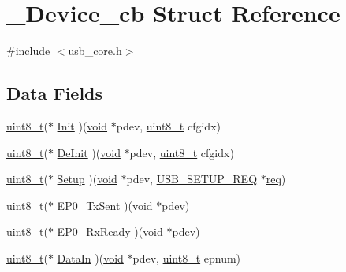 \hypertarget{struct___device__cb}{\section{\-\_\-\-Device\-\_\-cb Struct Reference}
\label{struct___device__cb}
}


{\ttfamily \#include $<$usb\-\_\-core.\-h$>$}

\subsection*{Data Fields}
\begin{DoxyCompactItemize}
\item 
\hyperlink{stdint_8h_aba7bc1797add20fe3efdf37ced1182c5}{uint8\-\_\-t}($\ast$ \hyperlink{struct___device__cb_a32d5bd2c14d36adaeee879efb2d99937}{Init} )(\hyperlink{group___n_a_m_e_ga18028b8badbf1ea7e704ccac3c488e82}{void} $\ast$pdev, \hyperlink{stdint_8h_aba7bc1797add20fe3efdf37ced1182c5}{uint8\-\_\-t} cfgidx)
\item 
\hyperlink{stdint_8h_aba7bc1797add20fe3efdf37ced1182c5}{uint8\-\_\-t}($\ast$ \hyperlink{struct___device__cb_a356783fc0dd7be07db7d764214937dad}{De\-Init} )(\hyperlink{group___n_a_m_e_ga18028b8badbf1ea7e704ccac3c488e82}{void} $\ast$pdev, \hyperlink{stdint_8h_aba7bc1797add20fe3efdf37ced1182c5}{uint8\-\_\-t} cfgidx)
\item 
\hyperlink{stdint_8h_aba7bc1797add20fe3efdf37ced1182c5}{uint8\-\_\-t}($\ast$ \hyperlink{struct___device__cb_ab7ffbb974bc00c175cfed7ba03c8b16b}{Setup} )(\hyperlink{group___n_a_m_e_ga18028b8badbf1ea7e704ccac3c488e82}{void} $\ast$pdev, \hyperlink{group___u_s_b___c_o_r_e___exported___types_gacd8d898c844c3657315c7d7a4ea3a99c}{U\-S\-B\-\_\-\-S\-E\-T\-U\-P\-\_\-\-R\-E\-Q} $\ast$\hyperlink{pios__opahrs__proto_8h_ad651fd9affe5ed0ac9abccd8e2791a2c}{req})
\item 
\hyperlink{stdint_8h_aba7bc1797add20fe3efdf37ced1182c5}{uint8\-\_\-t}($\ast$ \hyperlink{struct___device__cb_af5e2e1683935d2e6655930e8857fbc1d}{E\-P0\-\_\-\-Tx\-Sent} )(\hyperlink{group___n_a_m_e_ga18028b8badbf1ea7e704ccac3c488e82}{void} $\ast$pdev)
\item 
\hyperlink{stdint_8h_aba7bc1797add20fe3efdf37ced1182c5}{uint8\-\_\-t}($\ast$ \hyperlink{struct___device__cb_a88cc8d66e3ccb037e515a76a37f5aae5}{E\-P0\-\_\-\-Rx\-Ready} )(\hyperlink{group___n_a_m_e_ga18028b8badbf1ea7e704ccac3c488e82}{void} $\ast$pdev)
\item 
\hyperlink{stdint_8h_aba7bc1797add20fe3efdf37ced1182c5}{uint8\-\_\-t}($\ast$ \hyperlink{struct___device__cb_a123969c5d82101054ecfa686ea695db0}{Data\-In} )(\hyperlink{group___n_a_m_e_ga18028b8badbf1ea7e704ccac3c488e82}{void} $\ast$pdev, \hyperlink{stdint_8h_aba7bc1797add20fe3efdf37ced1182c5}{uint8\-\_\-t} epnum)

\end{DoxyCompactItemize}
